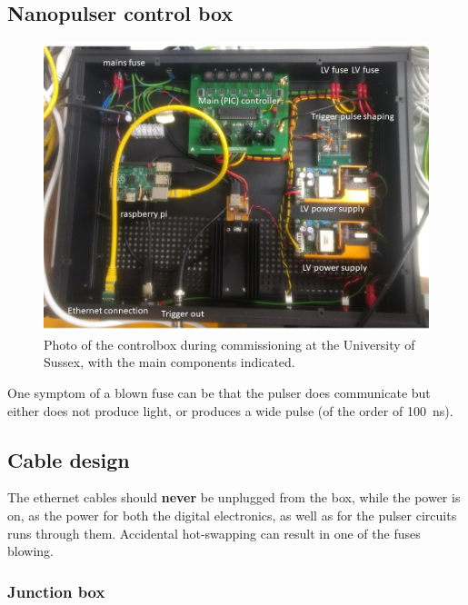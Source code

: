 
\subsection*{Nanopulser control box}

\begin{figure}
\begin{center}	
  \includegraphics[width=0.75\linewidth]{figures/controlbox.jpg}
  \caption{Photo of the controlbox during commissioning at the University of Sussex, with the main components indicated.}
  \label{figure:controlbox}
\end{center}
\end{figure}

One symptom of a blown fuse can be that  the pulser does communicate but either does not produce light, or produces a wide pulse (of the order of 100~ns).


\subsection*{Cable design}


The ethernet cables should {\bf never} be unplugged from the box, while the power is on, as the power for both the digital electronics, as well as for the pulser circuits runs through them. Accidental hot-swapping can result in one of the fuses blowing. 

\subsubsection*{Junction box}


